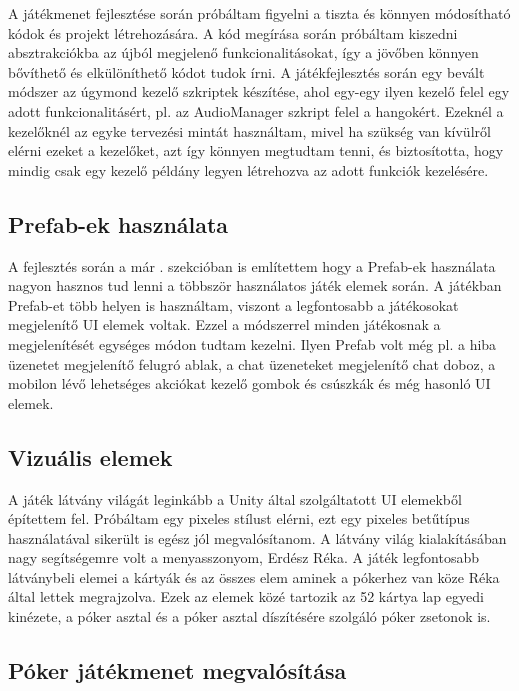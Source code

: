\documentclass[]{thesis-ekf}
\theoremstyle{definition}
\theoremstyle{remark}
\begin{document}
A játékmenet fejlesztése során próbáltam figyelni a tiszta és könnyen módosítható kódok és projekt létrehozására. A kód megírása során próbáltam kiszedni absztrakciókba az újból megjelenő funkcionalitásokat, így a jövőben könnyen bővíthető és elkülöníthető kódot tudok írni. A játékfejlesztés során egy bevált módszer az úgymond kezelő szkriptek készítése, ahol egy-egy ilyen kezelő felel egy adott funkcionalitásért, pl. az AudioManager szkript felel a hangokért. Ezeknél a kezelőknél az egyke tervezési mintát használtam, mivel ha szükség van kívülről elérni ezeket a kezelőket, azt így könnyen megtudtam tenni, és biztosította, hogy mindig csak egy kezelő példány legyen létrehozva az adott funkciók kezelésére.

\subsection{Prefab-ek használata}

A fejlesztés során a már . szekcióban is említettem hogy a Prefab-ek használata nagyon hasznos tud lenni a többször használatos játék elemek során. A játékban Prefab-et több helyen is használtam, viszont a legfontosabb a játékosokat megjelenítő UI elemek voltak. Ezzel a módszerrel minden játékosnak a megjelenítését egységes módon tudtam kezelni. Ilyen Prefab volt még pl. a hiba üzenetet megjelenítő felugró ablak, a chat üzeneteket megjelenítő chat doboz, a mobilon lévő lehetséges akciókat kezelő gombok és csúszkák és még hasonló UI elemek.

\subsection{Vizuális elemek}

A játék látvány világát leginkább a Unity által szolgáltatott UI elemekből építettem fel. Próbáltam egy pixeles stílust elérni, ezt egy pixeles betűtípus használatával sikerült is egész jól megvalósítanom. A látvány világ kialakításában nagy segítségemre volt a menyasszonyom, Erdész Réka. A játék legfontosabb látványbeli elemei a kártyák és az összes elem aminek a pókerhez van köze Réka által lettek megrajzolva. Ezek az elemek közé tartozik az 52 kártya lap egyedi kinézete, a póker asztal és a póker asztal díszítésére szolgáló póker zsetonok is.

\subsection{Póker játékmenet megvalósítása}
\end{document}
